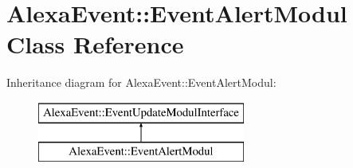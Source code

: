 \hypertarget{classAlexaEvent_1_1EventAlertModul}{}\section{Alexa\+Event\+:\+:Event\+Alert\+Modul Class Reference}
\label{classAlexaEvent_1_1EventAlertModul}
Inheritance diagram for Alexa\+Event\+:\+:Event\+Alert\+Modul\+:\begin{figure}[H]
\begin{center}
\leavevmode
\includegraphics[height=2.000000cm]{d7/de9/classAlexaEvent_1_1EventAlertModul}
\end{center}
\end{figure}
